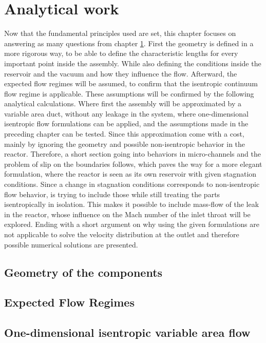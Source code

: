 \section{Analytical work}
	Now that the fundamental principles used are set, this chapter focuses on answering as many questions from chapter \ref{}.
	First the geometry is defined in a more rigorous way, to be able to define the characteristic lengths for every important point inside the assembly.
	While also defining the conditions inside the reservoir and the vacuum and how they influence the flow.
	Afterward, the expected flow regimes will be assumed, to confirm that the isentropic continuum flow regime is applicable.
	These assumptions will be confirmed by the following analytical calculations.
	Where first the assembly will be approximated by a variable area duct, without any leakage in the system, where one-dimensional isentropic flow formulations can be applied, and the assumptions made in the preceding chapter can be tested.
	Since this approximation come with a cost, mainly by ignoring the geometry and possible non-isentropic behavior in the reactor.
	Therefore, a short section going into behaviors in micro-channels and the problem of slip on the boundaries follows, which paves the way for a more elegant formulation, where the reactor is seen as its own reservoir with given stagnation conditions.
	Since a change in stagnation conditions corresponds to non-isentropic flow behavior, is trying to include those while still treating the parts isentropically in isolation.
	This makes it possible to include mass-flow of the leak in the reactor, whose influence on the Mach number of the inlet throat will be explored.
	Ending with a short argument on why using the given formulations are not applicable to solve the velocity distribution at the outlet and therefore possible numerical solutions are presented.

\subsection{Geometry of the components}\label{sec:geometry}
	

\subsection{Expected Flow Regimes}\label{sec:expected-flow-regimes}
	
	\newpage

\subsection{One-dimensional isentropic variable area flow}\label{sec:one-dim-isentropic}
	
	\newpage

